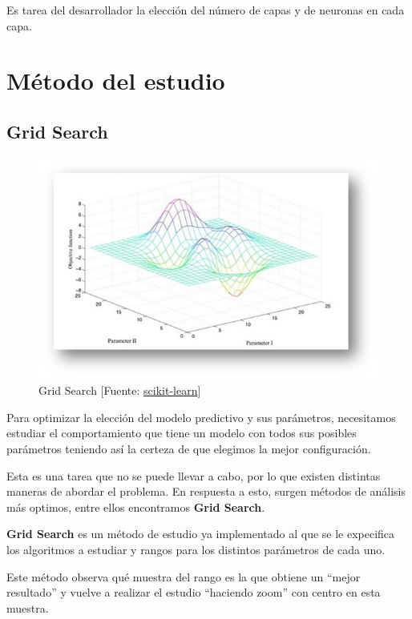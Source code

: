 	Es tarea del desarrollador la elección del número de capas y de neuronas en cada capa.

\section{Método del estudio}
\label{makereference4.4}
	\subsection{Grid Search}

	\begin{figure}[htb]
		\begin{center}
			\includegraphics[width=4.5in]{figures/grid_search.jpeg}
			\caption{Grid Search [Fuente: \href{www.scikit-learn.org}{scikit-learn}]}
		\end{center}
		\label{grid}
	\end{figure}

	Para optimizar la elección del modelo predictivo y sus parámetros, necesitamos estudiar el comportamiento que tiene un modelo con todos sus posibles parámetros teniendo así la certeza de que elegimos la mejor configuración.

	Esta es una tarea que no se puede llevar a cabo, por lo que existen distintas maneras de abordar el problema. En respuesta a esto, surgen métodos de análisis más optimos, entre ellos encontramos \textbf{Grid Search}.

	\textbf{Grid Search} es un método de estudio ya implementado al que se le expecifica los algoritmos a estudiar y rangos para los distintos parámetros de cada uno. 

	Este método observa qué muestra del rango es la que obtiene un ``mejor resultado'' y vuelve a realizar el estudio ``haciendo zoom'' con centro en esta muestra.

